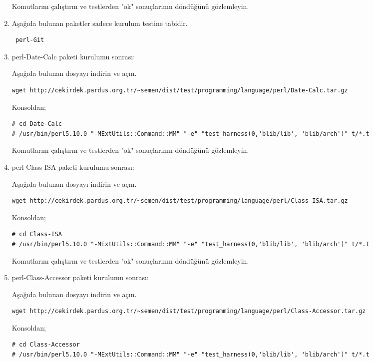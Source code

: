 \documentclass[a4paper,10pt]{article}
\begin{document}
\begin{enumerate}
Komutlarını çalıştırın ve testlerden "ok" sonuçlarının döndüğünü gözlemleyin.

\item Aşağıda bulunan paketler sadece kurulum testine tabidir.
\begin{verbatim}
 perl-Git
\end{verbatim}

\item perl-Date-Calc paketi kurulumu sonrası:

Aşağıda bulunan dosyayı indirin ve açın.
\begin{verbatim}
wget http://cekirdek.pardus.org.tr/~semen/dist/test/programming/language/perl/Date-Calc.tar.gz
\end{verbatim}

Konsoldan;
\begin{verbatim}
# cd Date-Calc
# /usr/bin/perl5.10.0 "-MExtUtils::Command::MM" "-e" "test_harness(0,'blib/lib', 'blib/arch')" t/*.t
\end{verbatim}

Komutlarını çalıştırın ve testlerden "ok" sonuçlarının döndüğünü gözlemleyin.

\item perl-Class-ISA paketi kurulumu sonrası:

Aşağıda bulunan dosyayı indirin ve açın.
\begin{verbatim}
wget http://cekirdek.pardus.org.tr/~semen/dist/test/programming/language/perl/Class-ISA.tar.gz
\end{verbatim}

Konsoldan;
\begin{verbatim}
# cd Class-ISA
# /usr/bin/perl5.10.0 "-MExtUtils::Command::MM" "-e" "test_harness(0,'blib/lib', 'blib/arch')" t/*.t
\end{verbatim}

Komutlarını çalıştırın ve testlerden "ok" sonuçlarının döndüğünü gözlemleyin.

\item perl-Class-Accessor paketi kurulumu sonrası:

Aşağıda bulunan dosyayı indirin ve açın.
\begin{verbatim}
wget http://cekirdek.pardus.org.tr/~semen/dist/test/programming/language/perl/Class-Accessor.tar.gz
\end{verbatim}

Konsoldan;
\begin{verbatim}
# cd Class-Accessor
# /usr/bin/perl5.10.0 "-MExtUtils::Command::MM" "-e" "test_harness(0,'blib/lib', 'blib/arch')" t/*.t
\end{verbatim}


\end{enumerate}
\end{document}
